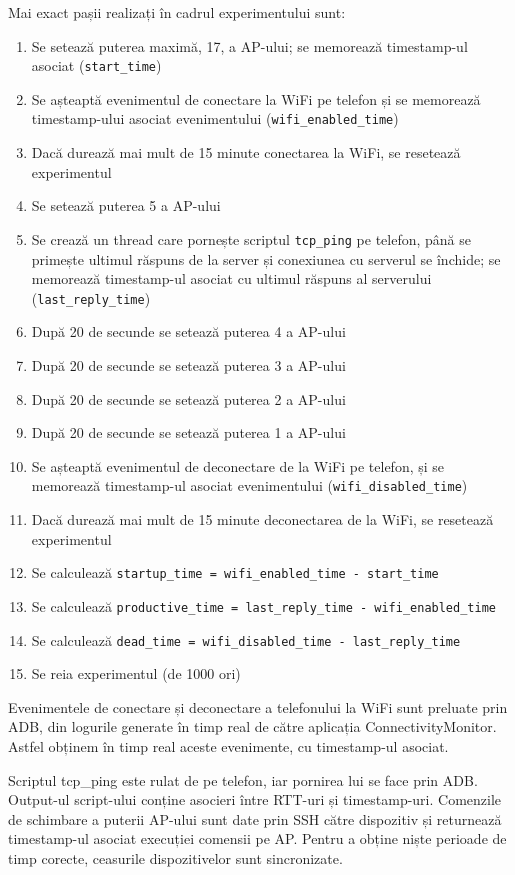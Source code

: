 Mai exact pașii realizați în cadrul experimentului sunt:
\begin{enumerate}
	\item Se setează puterea maximă, 17,  a AP-ului; se memorează timestamp-ul asociat (\texttt{start\_time})
	\item Se așteaptă evenimentul de conectare la WiFi pe telefon și se memorează timestamp-ului asociat evenimentului (\texttt{wifi\_enabled\_time})
	\item Dacă durează mai mult de 15 minute conectarea la WiFi, se resetează experimentul
	\item Se setează puterea 5 a AP-ului
	\item Se crează un thread care pornește scriptul \texttt{tcp\_ping} pe telefon, până se primește ultimul răspuns de la server și conexiunea cu serverul se închide; se memorează timestamp-ul asociat cu ultimul răspuns al serverului (\texttt{last\_reply\_time})
	\item După 20 de secunde se setează puterea 4 a AP-ului
	\item După 20 de secunde se setează puterea 3 a AP-ului
	\item După 20 de secunde se setează puterea 2 a AP-ului
	\item După 20 de secunde se setează puterea 1 a AP-ului
	\item Se așteaptă evenimentul de deconectare de la WiFi pe telefon, și se memorează timestamp-ul asociat evenimentului (\texttt{wifi\_disabled\_time})
	\item Dacă durează mai mult de 15 minute deconectarea de la WiFi, se resetează experimentul
	\item Se calculează \texttt{startup\_time = wifi\_enabled\_time - start\_time}
	\item Se calculează \texttt{productive\_time = last\_reply\_time - wifi\_enabled\_time}
	\item Se calculează \texttt{dead\_time = wifi\_disabled\_time - last\_reply\_time}
	\item Se reia experimentul (de 1000 ori)
\end{enumerate}

Evenimentele de conectare și deconectare a telefonului la WiFi sunt preluate prin ADB, din logurile generate în timp real de către aplicația ConnectivityMonitor. Astfel obținem în timp real aceste evenimente, cu timestamp-ul asociat.

Scriptul tcp\_ping este rulat de pe telefon, iar pornirea lui se face prin ADB. Output-ul script-ului conține asocieri între RTT-uri și timestamp-uri. Comenzile de schimbare a puterii AP-ului sunt date prin SSH către dispozitiv și returnează timestamp-ul asociat execuției comensii pe AP. Pentru a obține niște perioade de timp corecte, ceasurile dispozitivelor sunt sincronizate.

